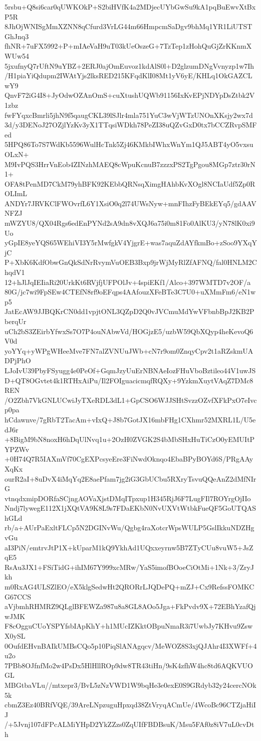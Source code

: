 5rsbu+Q8si6car0qUWKOkP+S2biHVfK4a2MDjecUYbGwSu9kA1pqBuEwvXtBxP5R
8JhOjWNISgMmXZNN8qCfurd3VrLG44m66HmpcmSaDgv9bhMq1YR1LiUTSTGhJnq3
fhNR+7uFX5992+P+mIAeVaH9uT03kUeOszeG+7TzTep1zHohQuGjZrKKnmXWUw54
5jxufnyQ7rUftN9uYBZ+2ERJ0ajOmEuvoz1kdAlS0l+D2glzumDNgVvnyzp1w7Ih
/H1piaYiQdupm2IWAtYjs2lksRED215KFqdKlI08Mt1yV6yE/KHLq1OkGAZCLwY9
QnvF72iG4I8+JyOdwOZAnOmS+cuXtushUQWb91156IxKvEPjNDYpDsZtbk2V1zbz
fwFYqxcBmrli5jhN9f5qaugCKL39lSJlr4mla751YuC3wVjWTzUNOnXKsjy2wx7d
3d/y3DENoJ27OZjlYzKv3yX1TTqsiWDkh78PeZI38uQZvGxD0tx7bCCZRvpSMFed
5HPQ86To7S7WdKb5596WulHcTnk5Zj46KMkbIWhxWnYm1QJ5ABT4yO5vxsuOLxN+
M9IvPQS3HrrVnEob4ZINzhMAEQ8cWpuKcnuB7zzzxPS2TgPgou8MGp7ztr30rN1+
OFA8tPenMD7CkM79yhBFK92KEbbQRNsqXimgHAhbKvXOgl8NCIaUdf5Zp0ROLImL
ANDYr7JRVKClFWOvrfL6Y1XsiO0q2l74UWsNyw+mnFIhzFyBEkEYq5/gdAAVNFZJ
mWZYU8/QX04Rgs6edEnPYNd2sA9dn8vXQJ6a75i0m81Fo0AlKU3/yN78lK0xi9Uo
yGpIE8yeYQS65WEhiVI3Y5rMwfgkV4YjgrE+was7aquZdAYfkmBo+zSoo9YXqYjC
P+XbK6KdfObwGnQkSdNrRvymVuOEB3Bxp9jrWjMyRlZfAFNQ/fal0HNLM2ChqdV1
12+hJlJqIEIiaRi20UrkKt6RVjfjUFPOlJv+4spiEKf1/Alco+397WMTD7v2OF/a
80G/jc7wi9FpSEw4CTEfN8rf9oEFqps4AAfouzXFeBTe3C7U0+uXMmFm6/eN1wp5
JatEcAW9JJBQKrCN0dd1vpjtONL3QZpD2Q0vJVCmuMdYwVFbnbBpJ2KB2PberqUr
uCh2bS3ZEirbYfwxSs7O7P4ouNAbwVd/HOGjzE5/uzbW59QbXQyp4heKevoQ6V0d
yoYYq+yWPgWHeeMve7FN7alZVNUuJWb+cN7r9om0ZnqyCpv2t1aRZskmUADPjPhO
LJoIvU39PbyFSyugg4e0PeOf+GqmJzyUuErNBNAeIozFHuVboBztileo44V1uwJS
D+QT8OGvtet4k1RTHxAiPu/Il2FOIguacicmqfRQXy+9YzkmXuytVAqZ7DMc8REN
/O2Zbh7VkGNLUCwiJyTXeRDL3dL1+GpCSO6WJJSHtSvzzOZvfXFkPxO7eIvcp0pa
hCdawnve/7gRbT2TacAm+vIxQ+J8b7GotJX16mbFHg1CXhmr52MXRL1L/U5edJ6r
+8BigM9bN8noxH6hDqUlNvq1u+2OzH0ZVGK2S4bMbSHxHuTiCzO0yEMUItPYPZWv
+0H74Q7R5IAXmVf70CgEXPcsyeEre3FiNwdOknqo4EbaBPyBOYd6S/PRgAAyXqKx
ourR2aI+8uDvX4iMqYq2E8aePfam7jg2iG3GbUCbu5RXryTsvuQQeAnZ2dMfNIrG
vtnqdxmipDORfaSCjngAOVaXjstDMqITpxup1H345RjJ6F7LugFIl7ROYrgOjIIo
Nndj7lywegE112X1jXQtVA9K8L9s7FDaEKbN0NvUXVtWtbkFueQF5GoUTQAShGLd
rb/a+AUrPaExltFLCp5N2DGINvWu/Qgbg4raXotcrWpsWULP5GslIkkuNDZHgvGu
aI3PiN/emtrvJtP1X+kUparM1kQ9YkhAd1UQxxeyrnw5B7ZTyCUu8vuW5+JsZqE5
RsAu3JX1+FSiTidG+ihIM67Y999xcMRw/YaS5imofBOoeCiOtMi+1Nk+3/ZryJkh
m0RxAG4ULSZlEO/eX5klgSedwHt2QRORrLJQDePQ+mZJ+Cx9RefssFOMKCG67CCS
aVjbmhRHMRZ9QLglBFEWZa987u8a8GL8AOo5Jga+FkPvdv9X+72EBhYzafQjwJMK
F8cOgguCUoYSPYfsbIApKhY+h1MUcIZKktOBpuNmaR3i7UwbJy7KHvu9ZswX0ySL
0OufdEHvnBAIkUMBsCQo5p10PiqSlANAgqcv/MeWOZ8S3xjQJAhr4I3XWFf+4u2o
7PBb8OJfnfMo2w4PsDx5HlHllROp9dw8TR43tiHn/9sK4zfhW4hc8td6AQKVUOGL
MBGtbaVLu//mtxepr3/BvL5zNzVWD1W9bqHe3e0exE0S9GRdyb32y24cercNOk5k
cbmZ3Ez40BRfVQE/39AreLNpzuguHpxqd38ZtVryqACmUe/4WcoBc96CTZjaHiIJ
/+5Jvnj107dFPcALMiYHpD2YkZZzs0ZqUIfFBDBsuK/Msu5FAf0z8iV7uL0cvDth
